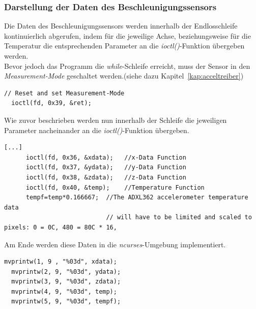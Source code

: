 \subsubsection{Darstellung der Daten des Beschleunigungssensors}\label{kap:darstellungaccel}

Die Daten des Beschleunigungssensors werden innerhalb der Endlosschleife kontinuierlich abgerufen, indem für
die jeweilige Achse, beziehungsweise für die Temperatur die entsprechenden Parameter an die \emph{ioctl()}-Funktion
übergeben werden. \\
Bevor jedoch das Programm die \emph{while}-Schleife erreicht, muss der Sensor in den \emph{Measurement-Mode} geschaltet
werden.(siehe dazu Kapitel~\ref{kap:acceltreiber})\\

\lstset{language=C}
\begin{lstlisting}[caption={Aktivierung des \emph{Measurement-Mode}},label={code:resetaccel}]
  // Reset and set Measurement-Mode
  ioctl(fd, 0x39, &ret);
 \end{lstlisting}

Wie zuvor beschrieben werden nun innerhalb der Schleife die jeweiligen Parameter nacheinander an die \emph{ioctl()}-Funktion
übergeben.\\

\lstset{language=C}
\begin{lstlisting}[caption={Aktivierung des \emph{Measurement-Mode}},label={code:resetaccel}]
[...]
      ioctl(fd, 0x36, &xdata);   //x-Data Function
      ioctl(fd, 0x37, &ydata);   //y-Data Function
      ioctl(fd, 0x38, &zdata);   //z-Data Function
      ioctl(fd, 0x40, &temp);    //Temperature Function
      tempf=temp*0.166667;  //The ADXL362 accelerometer temperature data
                            // will have to be limited and scaled to pixels: 0 = 0C, 480 = 80C * 16,
 \end{lstlisting}
\newpage
Am Ende werden diese Daten in die \emph{ncurses}-Umgebung implementiert.\\

\lstset{language=C}
\begin{lstlisting}[caption={Aktivierung des \emph{Measurement-Mode}},label={code:resetaccel}]
  mvprintw(1, 9 , "%03d", xdata);
  mvprintw(2, 9, "%03d", ydata);
  mvprintw(3, 9, "%03d", zdata);
  mvprintw(4, 9, "%03d", temp);
  mvprintw(5, 9, "%03d", tempf);
 \end{lstlisting}
